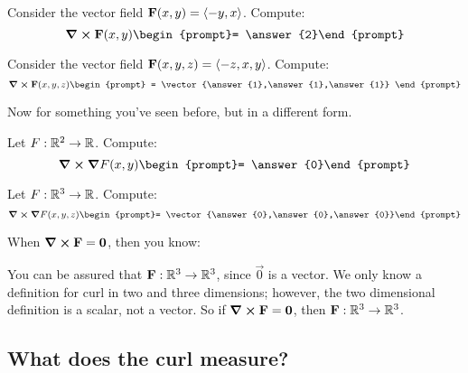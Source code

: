 \documentclass{ximera}
\begin{document}
\begin{question}
  Consider the vector field $\mathbf{F}(x,y) = \left\langle -y,x\right\rangle$. Compute:
  \[
  \curl\vec{F}(x,y) \begin{prompt}= \answer{2}\end{prompt}
  \]
  \begin{question}
    Consider the vector field $\mathbf{F}(x,y,z) = \left\langle -z,x,y\right\rangle$. Compute:
    \[
    \curl\vec{F}(x,y,z)   \begin{prompt}
      = \vector{\answer{1},\answer{1},\answer{1}}
    \end{prompt}
    \]
  \end{question}
\end{question}

Now for something you've seen before, but in a different form.

\begin{question}
  Let $F:\mathbb R^2\to\mathbb R$. Compute:
  \[
  \curl\grad F(x,y) \begin{prompt}= \answer{0}\end{prompt}
  \]
  \begin{question}
    Let $F:\mathbb R^3\to\mathbb R$. Compute:
    \[
    \curl\grad F(x,y,z) \begin{prompt}= \vector{\answer{0},\answer{0},\answer{0}}\end{prompt}
    \] 
  \end{question}
\end{question}

\begin{question}
  When $\boldsymbol\nabla\boldsymbol\times\mathbf{F} = \mathbf{0}$, then you know:
  \begin{selectAll}
  \end{selectAll}
  \begin{feedback}
    You can be assured that $\mathbf{F}:\mathbb R^3\to\mathbb R^3$, since $\vec{0}$ is
    a vector. We only know a definition for curl in two and three
    dimensions; however, the two dimensional definition is a scalar,
    not a vector. So if $\boldsymbol\nabla\boldsymbol\times\mathbf{F} = \mathbf{0}$, then $\mathbf{F}:\mathbb R^3\to\mathbb R^3$.
  \end{feedback}
\end{question}


\subsection{What does the curl measure?}
\end{document}
